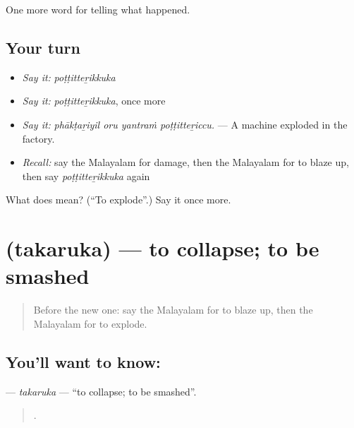 \begin{grammarlens}[title={What you've built}]
One more word for telling what happened.
\end{grammarlens}

\subsection*{Your turn}
\begin{itemize}
\raggedright
  \item \emph{Say it:} \emph{poṭṭitteṟikkuka}
  \item \emph{Say it:} \emph{poṭṭitteṟikkuka}, once more
  \item \emph{Say it:} \emph{phākṭaṟiyil oru yantraṁ poṭṭitteṟiccu.} — A machine exploded in the factory.
  \item \emph{Recall:} say the Malayalam for damage, then the Malayalam for to blaze up, then say \emph{poṭṭitteṟikkuka} again
\end{itemize}

\begin{tcolorbox}[breakable,colback=teal!4,colframe=teal!35!black,title={Before you move on}]
What does  mean? (\textquotedblleft{}To explode\textquotedblright{}.) Say it once more.
\end{tcolorbox}
\section[\texorpdfstring{\ml{തകരുക} (takaruka)}{തകരുക (takaruka)}]{ (takaruka) — to collapse; to be smashed}

\label{lesson:ML-C363-takaruka}



\begin{quote}
Before the new one: say the Malayalam for to blaze up, then the Malayalam for to explode.
\end{quote}

\subsection*{You'll want to know: }
\textbf{} — \emph{takaruka} — \textquotedblleft{}to collapse; to be smashed\textquotedblright{}.

\begin{quote}
    .
\end{quote}

